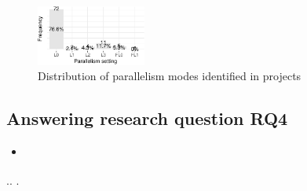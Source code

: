 \begin{figure}[ht!]
    \centering
    \includegraphics[width=0.32\textwidth]{plots/barplot-modes.pdf}
    \caption{\label{fig:freqmodes}Distribution of parallelism modes
    identified in  projects}
\end{figure}


\subsection{Answering research question RQ4}
\label{sec:rqD}

\begin{itemize}
    \item \emph{\RQD}
\end{itemize}

.. .

\Fix{---------------------}


